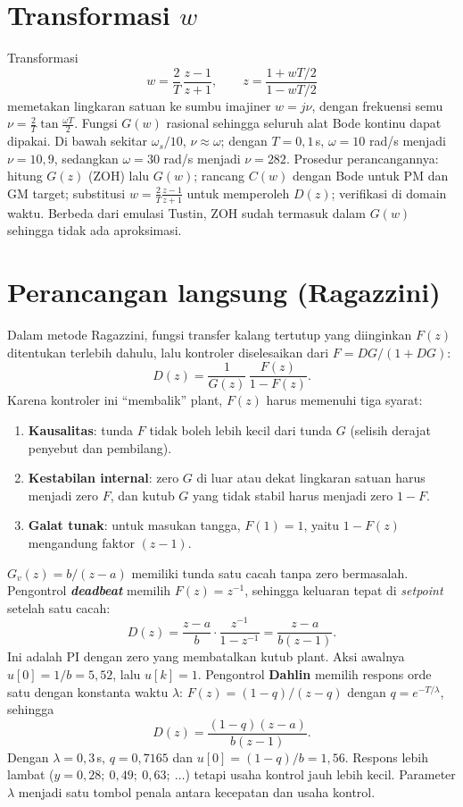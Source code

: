 \section{Transformasi $w$}
Transformasi
\begin{equation}
	w = \frac{2}{T}\,\frac{z-1}{z+1},\qquad z = \frac{1 + wT/2}{1 - wT/2}
\end{equation}
memetakan lingkaran satuan ke sumbu imajiner $w = j\nu$, dengan frekuensi semu $\nu = \frac{2}{T}\tan\frac{\omega T}{2}$. Fungsi $G(w)$ rasional sehingga seluruh alat Bode kontinu dapat dipakai. Di bawah sekitar $\omega_s/10$, $\nu \approx \omega$; dengan $T = 0{,}1$\,s, $\omega = 10$ rad/s menjadi $\nu = 10{,}9$, sedangkan $\omega = 30$ rad/s menjadi $\nu = 282$. Prosedur perancangannya: hitung $G(z)$ (ZOH) lalu $G(w)$; rancang $C(w)$ dengan Bode untuk PM dan GM target; substitusi $w = \frac2T\frac{z-1}{z+1}$ untuk memperoleh $D(z)$; verifikasi di domain waktu. Berbeda dari emulasi Tustin, ZOH sudah termasuk dalam $G(w)$ sehingga tidak ada aproksimasi.

\section{Perancangan langsung (Ragazzini)}
Dalam metode Ragazzini, fungsi transfer kalang tertutup yang diinginkan $F(z)$ ditentukan terlebih dahulu, lalu kontroler diselesaikan dari $F = DG/(1+DG)$:
\begin{equation}
	D(z) = \frac{1}{G(z)}\,\frac{F(z)}{1 - F(z)}.
\end{equation}
Karena kontroler ini ``membalik'' plant, $F(z)$ harus memenuhi tiga syarat:
\begin{enumerate}
	\item \textbf{Kausalitas}: tunda $F$ tidak boleh lebih kecil dari tunda $G$ (selisih derajat penyebut dan pembilang).
	\item \textbf{Kestabilan internal}: zero $G$ di luar atau dekat lingkaran satuan harus menjadi zero $F$, dan kutub $G$ yang tidak stabil harus menjadi zero $1-F$.
	\item \textbf{Galat tunak}: untuk masukan tangga, $F(1) = 1$, yaitu $1-F(z)$ mengandung faktor $(z-1)$.
\end{enumerate}

\begin{contoh}
	$G_v(z) = b/(z-a)$ memiliki tunda satu cacah tanpa zero bermasalah. Pengontrol \textbf{\textit{deadbeat}} memilih $F(z) = z^{-1}$, sehingga keluaran tepat di \textit{setpoint} setelah satu cacah:
	\[
		D(z) = \frac{z-a}{b}\cdot\frac{z^{-1}}{1-z^{-1}} = \frac{z-a}{b(z-1)}.
	\]
	Ini adalah PI dengan zero yang membatalkan kutub plant. Aksi awalnya $u[0] = 1/b = 5{,}52$, lalu $u[k] = 1$. Pengontrol \textbf{Dahlin} memilih respons orde satu dengan konstanta waktu $\lambda$: $F(z) = (1-q)/(z-q)$ dengan $q = e^{-T/\lambda}$, sehingga
	\[
		D(z) = \frac{(1-q)(z-a)}{b(z-1)}.
	\]
	Dengan $\lambda = 0{,}3$\,s, $q = 0{,}7165$ dan $u[0] = (1-q)/b = 1{,}56$. Respons lebih lambat ($y = 0{,}28;\ 0{,}49;\ 0{,}63;\ \dots$) tetapi usaha kontrol jauh lebih kecil. Parameter $\lambda$ menjadi satu tombol penala antara kecepatan dan usaha kontrol.
\end{contoh}

